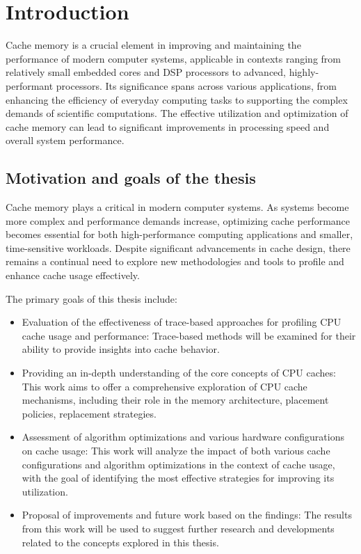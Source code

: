 
\chapter{Introduction}
Cache memory is a crucial element in improving and maintaining the performance of modern computer systems, applicable in contexts ranging from relatively small embedded cores
and DSP processors to advanced, highly-performant processors. Its significance spans across various applications, from enhancing the efficiency of everyday computing tasks to
supporting the complex demands of scientific computations. The effective utilization and optimization of cache memory can lead to significant improvements in processing speed and
overall system performance.

\section{Motivation and goals of the thesis}
Cache memory plays a critical in modern computer systems. As systems become more complex and performance demands increase, optimizing cache performance becomes
essential for both high-performance computing applications and smaller, time-sensitive workloads. Despite significant advancements in cache design, there remains a continual need
to explore new methodologies and tools to profile and enhance cache usage effectively.

\vspace{10px}
\noindent The primary goals of this thesis include:

\begin{itemize}
  \item Evaluation of the effectiveness of trace-based approaches for profiling CPU cache usage and performance: Trace-based methods will be examined for their ability to provide
    insights into cache behavior.
  \item Providing an in-depth understanding of the core concepts of CPU caches: This work aims to offer a comprehensive exploration of CPU cache mechanisms, including their role in
    the memory architecture, placement policies, replacement strategies.
  \item Assessment of algorithm optimizations and various hardware configurations on cache usage: This work will analyze the impact of both various cache configurations
    and algorithm optimizations in the context of cache usage, with the goal of identifying the most effective strategies for improving its utilization.
  \item Proposal of improvements and future work based on the findings: The results from this work will be used to suggest further research and developments related to the concepts
explored in this thesis.

\end{itemize}

